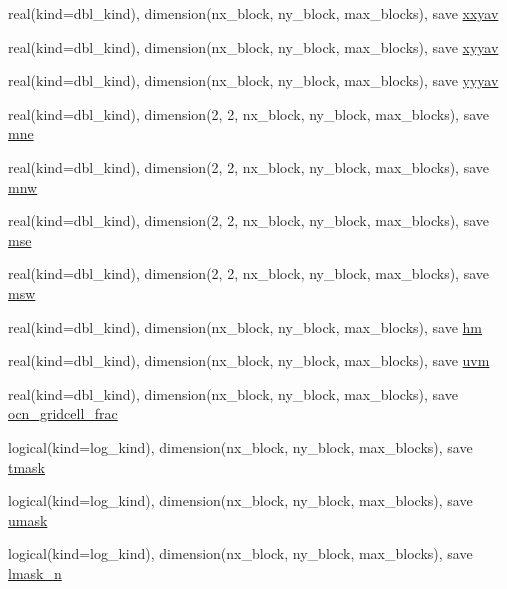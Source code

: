 \begin{DoxyCompactItemize}
real(kind=dbl\_\-kind), dimension(nx\_\-block, ny\_\-block, max\_\-blocks), save \hyperlink{namespaceice__grid_a471e3cdf6d11b7f3831afcdfb354fbfc}{xxyav}
\item 
real(kind=dbl\_\-kind), dimension(nx\_\-block, ny\_\-block, max\_\-blocks), save \hyperlink{namespaceice__grid_ab0c9d28119dfb18bfc26a3f493b2e844}{xyyav}
\item 
real(kind=dbl\_\-kind), dimension(nx\_\-block, ny\_\-block, max\_\-blocks), save \hyperlink{namespaceice__grid_a9ed5ccbe07d1272b819d05221f756b06}{yyyav}
\item 
real(kind=dbl\_\-kind), dimension(2, 2, nx\_\-block, ny\_\-block, max\_\-blocks), save \hyperlink{namespaceice__grid_ac0cdb9f8f4e8be0dcf32a5e7adb1ac53}{mne}
\item 
real(kind=dbl\_\-kind), dimension(2, 2, nx\_\-block, ny\_\-block, max\_\-blocks), save \hyperlink{namespaceice__grid_a9d5b1bf4f3c68140602c96bf28865733}{mnw}
\item 
real(kind=dbl\_\-kind), dimension(2, 2, nx\_\-block, ny\_\-block, max\_\-blocks), save \hyperlink{namespaceice__grid_a63866b0446065c97c825f70fc29a3654}{mse}
\item 
real(kind=dbl\_\-kind), dimension(2, 2, nx\_\-block, ny\_\-block, max\_\-blocks), save \hyperlink{namespaceice__grid_a517a26693b149509ae9e4a6c2f310dda}{msw}
\item 
real(kind=dbl\_\-kind), dimension(nx\_\-block, ny\_\-block, max\_\-blocks), save \hyperlink{namespaceice__grid_a7ecb27b1b130ed860c56ab81f4a9373e}{hm}
\item 
real(kind=dbl\_\-kind), dimension(nx\_\-block, ny\_\-block, max\_\-blocks), save \hyperlink{namespaceice__grid_aa8b13eb710c7be4a90e210294e37b5af}{uvm}
\item 
real(kind=dbl\_\-kind), dimension(nx\_\-block, ny\_\-block, max\_\-blocks), save \hyperlink{namespaceice__grid_a5241715733bdedb6dc95cff6f23292de}{ocn\_\-gridcell\_\-frac}
\item 
logical(kind=log\_\-kind), dimension(nx\_\-block, ny\_\-block, max\_\-blocks), save \hyperlink{namespaceice__grid_a5de6731a3b8601be3495a4c306832bf0}{tmask}
\item 
logical(kind=log\_\-kind), dimension(nx\_\-block, ny\_\-block, max\_\-blocks), save \hyperlink{namespaceice__grid_a02f5ae5edcea6185af4949d9be61cc26}{umask}
\item 
logical(kind=log\_\-kind), dimension(nx\_\-block, ny\_\-block, max\_\-blocks), save \hyperlink{namespaceice__grid_ae9873cb5a374679eb9105cbd0b3adaef}{lmask\_\-n}
\item 

\end{DoxyCompactItemize}
